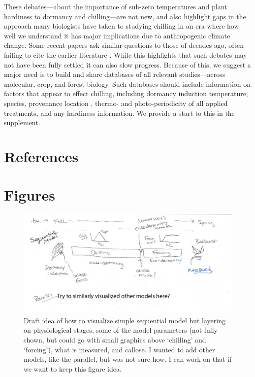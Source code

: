 \documentclass[11pt]{article}
\begin{document}
These debates---about the importance of sub-zero temperatures and plant hardiness to dormancy and chilling---are not new, and also highlight gaps in the approach many biologists have taken to studying chilling in an era where how well we understand it has major implications due to anthropogenic climate change. Some recent papers  ask similar questions to those of decades ago, often failing to cite the earlier literature \citep[e.g.,][]{lamb1948effect,Man:2010aa,baum2021}. While this highlights that such debates may not have been fully settled it can also slow progress. Because of this, we suggest a major need is to build and share databases of all relevant studies---across molecular, crop, and forest biology. Such databases should include information on factors that appear to effect chilling, including dormancy induction temperature, species, provenance location  \citep[as different populations may need different chilling][]{campbell1979,leinonen1996dependence}, thermo- and photo-periodicity of all applied treatments, and any hardiness information. We provide a start to this in the supplement. %




\clearpage

\section{References}



\clearpage
\section{Figures}

\begin{figure}[h!]
\includegraphics[width=1\textwidth]{..//figures/chillingmodel_drafttext.png}
\caption{Draft idea of how to visualize simple sequential model but layering on physiological stages, some of the model parameters (not fully shown, but could go with small graphics above `chilling' and `forcing'), what is measured, and callose. I wanted to add other models, like the parallel, but was not sure how. I can work on that if we want to keep this figure idea.} 
\label{fig:modelsketch}
\end{figure}
\end{document}
